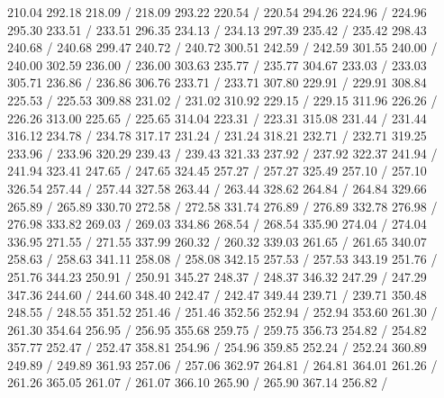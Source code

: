 { 210.04 292.18 218.09 /
 218.09 293.22 220.54 /
 220.54 294.26 224.96 /
 224.96 295.30 233.51 /
 233.51 296.35 234.13 /
 234.13 297.39 235.42 /
 235.42 298.43 240.68 /
 240.68 299.47 240.72 /
 240.72 300.51 242.59 /
 242.59 301.55 240.00 /
 240.00 302.59 236.00 /
 236.00 303.63 235.77 /
 235.77 304.67 233.03 /
 233.03 305.71 236.86 /
 236.86 306.76 233.71 /
 233.71 307.80 229.91 /
 229.91 308.84 225.53 /
 225.53 309.88 231.02 /
 231.02 310.92 229.15 /
 229.15 311.96 226.26 /
 226.26 313.00 225.65 /
 225.65 314.04 223.31 /
 223.31 315.08 231.44 /
 231.44 316.12 234.78 /
 234.78 317.17 231.24 /
 231.24 318.21 232.71 /
 232.71 319.25 233.96 /
 233.96 320.29 239.43 /
 239.43 321.33 237.92 /
 237.92 322.37 241.94 /
 241.94 323.41 247.65 /
 247.65 324.45 257.27 /
 257.27 325.49 257.10 /
 257.10 326.54 257.44 /
 257.44 327.58 263.44 /
 263.44 328.62 264.84 /
 264.84 329.66 265.89 /
 265.89 330.70 272.58 /
 272.58 331.74 276.89 /
 276.89 332.78 276.98 /
 276.98 333.82 269.03 /
 269.03 334.86 268.54 /
 268.54 335.90 274.04 /
 274.04 336.95 271.55 /
 271.55 337.99 260.32 /
 260.32 339.03 261.65 /
 261.65 340.07 258.63 /
 258.63 341.11 258.08 /
 258.08 342.15 257.53 /
 257.53 343.19 251.76 /
 251.76 344.23 250.91 /
 250.91 345.27 248.37 /
 248.37 346.32 247.29 /
 247.29 347.36 244.60 /
 244.60 348.40 242.47 /
 242.47 349.44 239.71 /
 239.71 350.48 248.55 /
 248.55 351.52 251.46 /
 251.46 352.56 252.94 /
 252.94 353.60 261.30 /
 261.30 354.64 256.95 /
 256.95 355.68 259.75 /
 259.75 356.73 254.82 /
 254.82 357.77 252.47 /
 252.47 358.81 254.96 /
 254.96 359.85 252.24 /
 252.24 360.89 249.89 /
 249.89 361.93 257.06 /
 257.06 362.97 264.81 /
 264.81 364.01 261.26 /
 261.26 365.05 261.07 /
 261.07 366.10 265.90 /
 265.90 367.14 256.82 /
}
